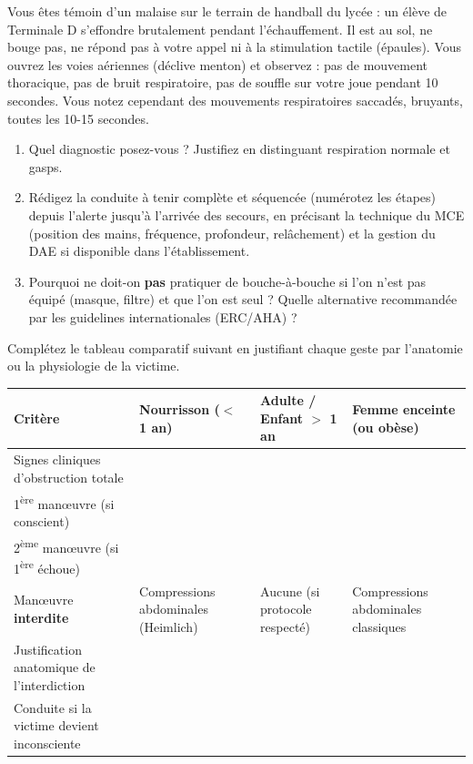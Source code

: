 \documentclass[11pt]{article}
\begin{document}
\begin{exercice}
Vous êtes témoin d'un malaise sur le terrain de handball du lycée : un élève de Terminale D s'effondre brutalement pendant l'échauffement. Il est au sol, ne bouge pas, ne répond pas à votre appel ni à la stimulation tactile (épaules). Vous ouvrez les voies aériennes (déclive menton) et observez : pas de mouvement thoracique, pas de bruit respiratoire, pas de souffle sur votre joue pendant 10 secondes. Vous notez cependant des mouvements respiratoires saccadés, bruyants, toutes les 10-15 secondes.
\begin{enumerate}
    \item Quel diagnostic posez-vous ? Justifiez en distinguant respiration normale et gasps.
    \item Rédigez la conduite à tenir complète et séquencée (numérotez les étapes) depuis l'alerte jusqu'à l'arrivée des secours, en précisant la technique du MCE (position des mains, fréquence, profondeur, relâchement) et la gestion du DAE si disponible dans l'établissement.
    \item Pourquoi ne doit-on \textbf{pas} pratiquer de bouche-à-bouche si l'on n'est pas équipé (masque, filtre) et que l'on est seul ? Quelle alternative recommandée par les guidelines internationales (ERC/AHA) ?
\end{enumerate}
\end{exercice}

\begin{exercice}
Complétez le tableau comparatif suivant en justifiant chaque geste par l'anatomie ou la physiologie de la victime.
\begin{center}
\begin{tabularx}{\linewidth}{|l|X|X|X|}
\hline
\rowcolor{popblueL}
\textbf{Critère} & \textbf{Nourrisson ($<$ 1 an)} & \textbf{Adulte / Enfant $>$ 1 an} & \textbf{Femme enceinte (ou obèse)} \\
\hline
Signes cliniques d'obstruction totale & & & \\
\hline
1\textsuperscript{ère} manœuvre (si conscient) & & & \\
\hline
2\textsuperscript{ème} manœuvre (si 1\textsuperscript{ère} échoue) & & & \\
\hline
Manœuvre \textbf{interdite} & Compressions abdominales (Heimlich) & Aucune (si protocole respecté) & Compressions abdominales classiques \\
\hline
Justification anatomique de l'interdiction & & & \\
\hline
Conduite si la victime devient inconsciente & & & \\
\hline
\end{tabularx}
\end{center}
\end{exercice}
\end{document}
